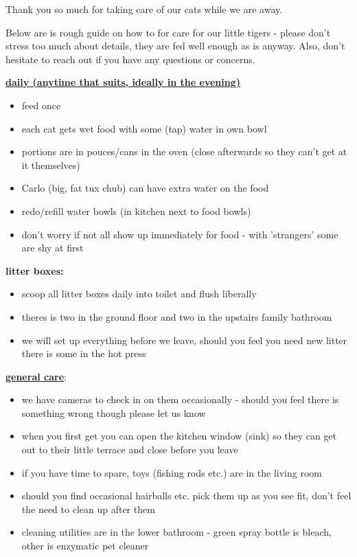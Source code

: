 \documentclass[10pt]{letter}
\DeclareRobustCommand{\mybox}[2][gray!40]{%
\begin{tcolorbox}[   %
        breakable,
        left=0pt,
        right=0pt,
        top=0pt,
        bottom=0pt,
        colback=#1,
        colframe=#1,
        width=\dimexpr\textwidth\relax,
        enlarge left by=0mm,
        boxsep=5pt,
        arc=0pt,outer arc=0pt,
        ]
        #2
\end{tcolorbox}
}
\begin{document}
\thispagestyle{empty}

Thank you so much for taking care of our cats while we are away.%

Below are is rough guide on how to for care for our little tigers - please don't stress too much about details, they are fed well enough as is anyway. Also, don't hesitate to reach out if you have any questions or concerns.%

\mybox{%
{\underline{\textbf{
    daily (anytime that suits, ideally in the evening)}}}

{\fontsize{10}{10}\selectfont
\begin{itemize}
    \item feed once
    \item each cat gets wet food with some (tap) water in own bowl
    \item portions are in pouces/cans in the oven (close afterwards so they can't get at it themselves)
    \item Carlo (big, fat tux chub) can have extra water on the food
    \item redo/refill water bowls (in kitchen next to food bowls)
    \item don't worry if not all show up immediately for food - with 'strangers' some are shy at first
\end{itemize}}

\textbf{litter boxes:}
{\fontsize{10}{10}\selectfont
\begin{itemize}
    \item scoop all litter boxes daily into toilet and flush liberally
    \item theres is two in the ground floor and two in the upstairs family bathroom
    \item we will set up everything before we leave, should you feel you need new litter there is some in the hot press
\end{itemize}}
}

\underline{\textbf{general care}}:
{\fontsize{10}{10}\selectfont
\begin{itemize}
    \item we have cameras to check in on them occasionally - should you feel there is something wrong though please let us know
    \item when you first get you can open the kitchen window (sink) so they can get out to their little terrace and close before you leave
    \item if you have time to spare, toys (fishing rods etc.) are in the living room
    \item should you find occasional hairballs etc. pick them up as you see fit, don't feel the need to clean up after them
    \item cleaning utilities are in the lower bathroom - green spray bottle is bleach, other is enzymatic pet cleaner
\end{itemize}}
\end{document}
